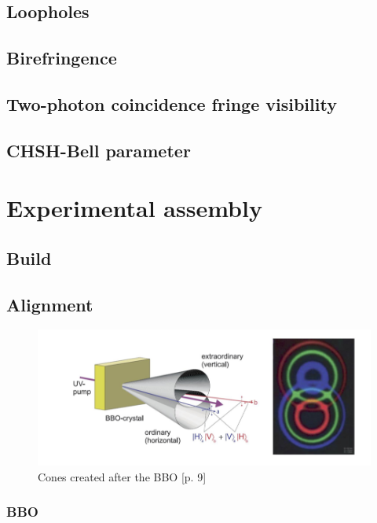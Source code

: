 \documentclass[12pt,a4paper]{article}
\begin{document}
\begin{multicols}{2}
\subsection{Loopholes}

\subsection{Birefringence}

\subsection{Two-photon coincidence fringe visibility}

\subsection{CHSH-Bell parameter}

\section{Experimental assembly}

\subsection{Build}

\subsection{Alignment}

\begin{figure}[H]
 \centering
 \includegraphics[scale=0.7]{./figures/cones.png}
 \caption{Cones created after the BBO \cite{physikwiki}[p. 9]}
 \label{fig:cones}
\end{figure}

\subsubsection{BBO}

\end{multicols}
\end{document}
